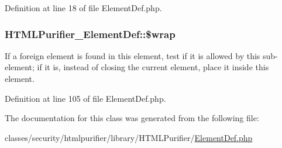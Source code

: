 Definition at line 18 of file Element\+Def.\+php.

\hypertarget{classHTMLPurifier__ElementDef_a9d58b1db4bc6a4aa7bf4e6896ba3b932}{
\subsubsection[{\$wrap}]{\setlength{\rightskip}{0pt plus 5cm}H\+T\+M\+L\+Purifier\+\_\+\+Element\+Def\+::\$wrap}}\label{classHTMLPurifier__ElementDef_a9d58b1db4bc6a4aa7bf4e6896ba3b932}
If a foreign element is found in this element, test if it is allowed by this sub-\/element; if it is, instead of closing the current element, place it inside this element. 

Definition at line 105 of file Element\+Def.\+php.



The documentation for this class was generated from the following file\+:\begin{DoxyCompactItemize}
\item 
classes/security/htmlpurifier/library/\+H\+T\+M\+L\+Purifier/\hyperlink{ElementDef_8php}{Element\+Def.\+php}\end{DoxyCompactItemize}
